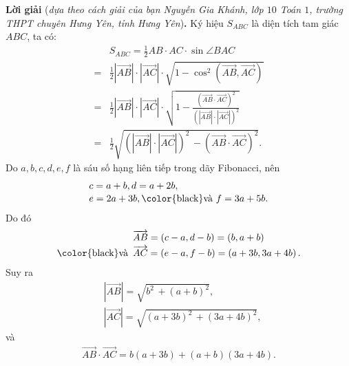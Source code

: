 \begin{multicols}{2}
	\vskip 0.05cm
	\textbf{\color{thachthuctoanhoc}Lời giải} (\textit{dựa theo cách giải của bạn Nguyễn Gia Khánh, lớp $10$ Toán $1$, trường THPT chuyên Hưng Yên, tỉnh Hưng Yên})\textbf{\color{thachthuctoanhoc}.}
	\vskip 0.05cm
	Ký hiệu $S_{ABC}$ là diện tích tam giác $ABC$, ta có:
	\begin{align*}
			&{S_{ABC}} = \frac{1}{2}AB \cdot AC \cdot \sin \angle BAC\\[-0.5ex]
			 = &\frac{1}{2}\left| {\overrightarrow {AB} } \right| \cdot \left| {\overrightarrow {AC} } \right| \cdot \sqrt {1 - {{\cos }^2}\left( {\overrightarrow {AB} ,\overrightarrow {AC} } \right)} \\[-0.5ex]
			 = &\frac{1}{2}\left| {\overrightarrow {AB} } \right| \cdot \left| {\overrightarrow {AC} } \right| \cdot \sqrt {1 - \frac{{{{\left( {\overrightarrow {AB}  \cdot \overrightarrow {AC} } \right)}^2}}}{{{{\left( {\left| {\overrightarrow {AB} } \right| \cdot \left| {\overrightarrow {AC} } \right|} \right)}^2}}}} \\[-0.5ex]
			 = &\frac{1}{2}\sqrt {{{\left( {\left| {\overrightarrow {AB} } \right| \cdot \left| {\overrightarrow {AC} } \right|} \right)}^2}\, - {{\left( {\overrightarrow {AB}  \cdot \overrightarrow {AC} } \right)}^2}}. \tag{$1$}
	\end{align*}
	Do $a, b, c, d, e, f$ là sáu số hạng liên tiếp trong dãy Fibonacci, nên
	\begin{align*}
		&c = a + b, d = a + 2b,\\[-0.4ex]
		&e = 2a + 3b, \text{\color{black}và } f = 3a + 5b.
	\end{align*}
	Do đó
	\begin{align*}
		&\overrightarrow {AB}  = \left( {c - a,d - b} \right) = \left( {b,a + b} \right)\\[-0.4ex]
		\text{\color{black}và}\,\,\, &\overrightarrow {AC}  = \left( {e - a,f - b} \right) = \left( {a + 3b,3a + 4b} \right).
	\end{align*}
	Suy ra
	\begin{align*}
		&\left| {\overrightarrow {AB} } \right| = \sqrt {{b^2}\, + {{\left( {a + b} \right)}^2}},\\[-0.4ex]
		&\left| {\overrightarrow {AC} } \right| = \sqrt {{{\left( {a + 3b} \right)}^2}\, + {{\left( {3a + 4b} \right)}^2}} ,
	\end{align*}
	và
	\begin{align*}
		\overrightarrow {AB}  \cdot \overrightarrow {AC}  = b\left( {a + 3b} \right) + \left( {a + b} \right)\left( {3a + 4b} \right).
	\end{align*}                                      

\end{multicols}
